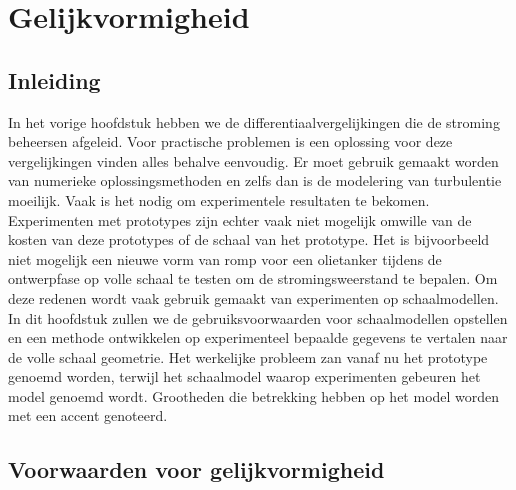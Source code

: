 \FloatBarrier
\chapter{Gelijkvormigheid}
\label{sec:Gelijkvormigheid}
	\FloatBarrier
	\section{Inleiding}
	\label{sec:Gelijkvormigheid Inleiding}
In het vorige hoofdstuk hebben we de differentiaalvergelijkingen die de stroming beheersen afgeleid. Voor practische problemen is een oplossing voor deze vergelijkingen vinden alles behalve eenvoudig. Er moet gebruik gemaakt worden van numerieke oplossingsmethoden en zelfs dan is de modelering van turbulentie moeilijk.
\npar
Vaak is het nodig om experimentele resultaten te bekomen. Experimenten met prototypes zijn echter vaak niet mogelijk omwille van de kosten van deze prototypes of de schaal van het prototype. Het is bijvoorbeeld niet mogelijk een nieuwe vorm van romp voor een olietanker tijdens de ontwerpfase op volle schaal te testen om de stromingsweerstand te bepalen. Om deze redenen wordt vaak gebruik gemaakt van experimenten op schaalmodellen.
\npar
In dit hoofdstuk zullen we de gebruiksvoorwaarden voor schaalmodellen opstellen en een methode ontwikkelen op experimenteel bepaalde gegevens te vertalen naar de volle schaal geometrie. Het werkelijke probleem zan vanaf nu het prototype genoemd worden, terwijl het schaalmodel waarop experimenten gebeuren het model genoemd wordt. Grootheden die betrekking hebben op het model worden met een accent genoteerd.
	\section{Voorwaarden voor gelijkvormigheid}
	\FloatBarrier
	\label{sec:Voorwaarden voor gelijkvormigheid}
